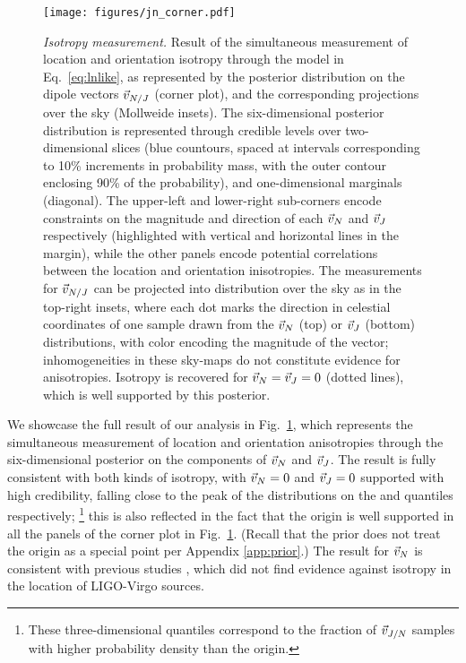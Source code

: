\documentclass[aps,prd,twocolumn,superscriptaddress,preprintnumbers,floatfix,nofootinbib]{revtex4-2}
\newcommand*{\vv}[1]{\textcolor{red}{[\textbf{VIJAY}: #1]}}
\newcommand{\clJ}{}
\newcommand{\clN}{}
\begin{document}
\begin{figure*}[p]
\texttt{[image: figures/jn\_corner.pdf]}
\caption{\emph{Isotropy measurement.} Result of the simultaneous measurement of location and orientation isotropy through the model in Eq.~\eqref{eq:lnlike}, as represented by the posterior distribution on the dipole vectors $\vec{v}_{N/J}$ (corner plot), and the corresponding projections over the sky (Mollweide insets).
The six-dimensional posterior distribution is represented through credible levels over two-dimensional slices (blue countours, spaced at intervals corresponding to 10\% increments in probability mass, with the outer contour enclosing 90\% of the probability), and one-dimensional marginals (diagonal).
The upper-left and lower-right sub-corners encode constraints on the magnitude and direction of each $\vec{v}_{N}$ and $\vec{v}_{J}$ respectively (highlighted with vertical and horizontal lines in the margin), while the other panels encode potential correlations between the location and orientation inisotropies.
The measurements for $\vec{v}_{N/J}$ can be projected into distribution over the sky as in the top-right insets, where each dot marks the direction in celestial coordinates of one sample drawn from the $\vec{v}_{N}$ (top) or $\vec{v}_{J}$ (bottom) distributions, with color encoding the magnitude of the vector; inhomogeneities in these sky-maps do not constitute evidence for anisotropies.
Isotropy is recovered for $\vec{v}_{N} = \vec{v}_{J} = 0$ (dotted lines), which is well supported by this posterior.
}
\label{fig:jn_corner}
\end{figure*}

We showcase the full result of our analysis in Fig.~\ref{fig:jn_corner}, which represents the simultaneous measurement of location and orientation anisotropies through the six-dimensional posterior on the components of $\vec{v}_{N}$ and $\vec{v}_{J}$.
The result is fully consistent with both kinds of isotropy, with $\vec{v}_{N} = 0$ and $\vec{v}_{J} = 0$ supported with high credibility, falling close to the peak of the distributions on the \clN and \clJ quantiles respectively;%
\footnote{These three-dimensional quantiles correspond to the fraction of $\vec{v}_{J/N}$ samples with higher probability density than the origin.}
 this is also reflected in the fact that the origin is well supported in all the panels of the corner plot in Fig.~\ref{fig:jn_corner}.
(Recall that the prior does not treat the origin as a special point per Appendix \ref{app:prior}.)
The result for $\vec{v}_{N}$ is consistent with previous studies \cite{Essick:2022slj}, which did not find evidence against isotropy in the location of LIGO-Virgo sources.
\end{document}
